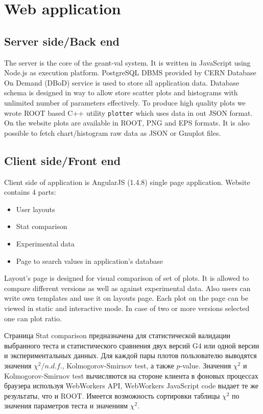 \section{Web application}
\label{sec-webapplication}

\subsection{Server side/Back end}
\label{sec-webapplication-server}

The server is the core of the geant-val system.
It is written in JavaScript using Node.js as execution platform. PostgreSQL DBMS provided by CERN Database On Demand (DBoD) service is used to store all application data. Database schema is designed in way to allow store scatter plots and histograms with unlimited number of parameters effectively. To produce high quality plots we wrote ROOT based C++ utility {\tt plotter} which uses data in out JSON format. On the website plots are available in  ROOT, PNG and EPS formats. It is also possible to fetch chart/histogram raw data as JSON or Gnuplot files.

\subsection{Client side/Front end}
\label{sec-webapplication-client}

Client side of application is AngularJS (1.4.8) single page application. Website contains 4 parts:

\begin{itemize}
    \item User layouts
    \item Stat comparison
    \item Experimental data
    \item Page to search values in application's database
\end{itemize}

Layout's page is designed for visual comparison of set of plots. It is allowed to compare different versions as well as against experimental data. Also users can write own templates and use it on layouts page. Each plot on the page can be viewed in static and interactive mode. In case of two or more versions selected one can plot ratio.

Страница Stat comparison предназначена для статистической валидации выбранного теста и статистического сравнения двух версий G4 или одной версии и экспериментальных данных. Для каждой пары плотов пользователю выводятся значения $\chi^2/n.d.f.$, Kolmogorov-Smirnov test, а также $p$-value. Значения $\chi^2$ и Kolmogorov-Smirnov test вычисляются на стороне клиента в фоновых процессах браузера используя WebWorkers API, WebWorkers JavaScript code выдает те же результаты, что и ROOT. Имеется возможность сортировки таблицы $\chi^2$ по значения параметров теста и значениям $\chi^2$.

